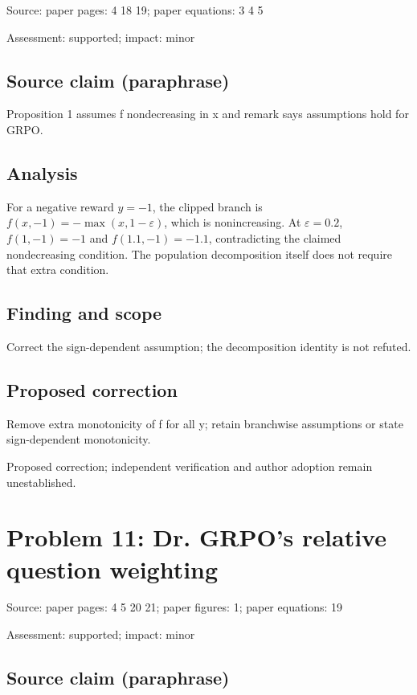 \documentclass[11pt]{article}
\begin{document}
Source: paper pages: 4 18 19; paper equations: 3 4 5

Assessment: supported; impact: minor

\subsection*{Source claim (paraphrase)}

Proposition 1 assumes f nondecreasing in x and remark says assumptions hold for GRPO.

\subsection*{Analysis}

For a negative reward \(y=-1\), the clipped branch is \(f(x,-1)=-\max(x,1-\varepsilon)\), which is nonincreasing. At \(\varepsilon=0.2\), \(f(1,-1)=-1\) and \(f(1.1,-1)=-1.1\), contradicting the claimed nondecreasing condition. The population decomposition itself does not require that extra condition.

\subsection*{Finding and scope}

Correct the sign-dependent assumption; the decomposition identity is not refuted.

\subsection*{Proposed correction}

Remove extra monotonicity of f for all y; retain branchwise assumptions or state sign-dependent monotonicity.

Proposed correction; independent verification and author adoption remain unestablished.

\section*{Problem 11: Dr. GRPO's relative question weighting}

Source: paper pages: 4 5 20 21; paper figures: 1; paper equations: 19

Assessment: supported; impact: minor

\subsection*{Source claim (paraphrase)}
\end{document}
